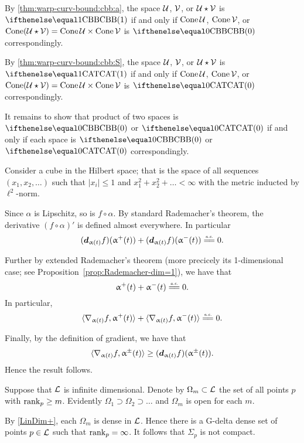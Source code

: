 By \ref{thm:warp-curv-bound:cbb:a}, the space $\mathcal{U}$, $\mathcal{V}$, or $\mathcal{U}\star\mathcal{V}$ is $\Alex1$ if and only if $\mathop{\rm Cone}\nolimits\mathcal{U}$, $\mathop{\rm Cone}\nolimits\mathcal{V}$, or $\Cone(\spc{U}\star\spc{V})=\Cone\spc{U}\times\Cone\spc{V}$ is $\Alex0$ correspondingly.

By \ref{thm:warp-curv-bound:cbb:S}, the space $\mathcal{U}$, $\mathcal{V}$, or $\mathcal{U}\star\mathcal{V}$ is $\CAT1$ if and only if $\mathop{\rm Cone}\nolimits\mathcal{U}$, $\mathop{\rm Cone}\nolimits\mathcal{V}$, or $\Cone(\spc{U}\star\spc{V})=\Cone\spc{U}\times\Cone\spc{V}$ is $\CAT0$ correspondingly.

It remains to show that product of two spaces is $\Alex0$ or $\CAT0$ if and only if each space is $\Alex0$ or $\CAT0$ correspondingly.

Consider a cube in the Hilbert space;
that is the space of all sequences $(x_1,x_2,\dots)$ such that $|x_i|\le 1$ and $x_1^2+x_2^2+\dots<\infty$ with the metric inducted by $\ell^2$-norm.




Since $\alpha$ is Lipschitz, so is $f\circ\alpha$.
By standard Rademacher's theorem, the derivative $(f\circ\alpha)'$ is defined almost everywhere.
In particular 
\[(\dd_{\alpha(t)}f)(\alpha^+(t))+(\dd_{\alpha(t)}f)(\alpha^-(t))\ae0.\]

Further by extended Rademacher's theorem (more precicely its 1-dimensional case; see Proposition~\ref{prop:Rademacher-dim=1}),
we have that
\[\alpha^+(t)+\alpha^-(t)\ae0.\]
In particular,
\[\<\nabla_{\alpha(t)}f,\alpha^+(t)\>+\<\nabla_{\alpha(t)}f,\alpha^-(t)\>
\ae0.\]

Finally, by the definition of gradient, we have that 
\[\<\nabla_{\alpha(t)}f,\alpha^\pm(t)\>\ge (\dd_{\alpha(t)}f)(\alpha^\pm(t)).\]
Hence the result follows.


Suppose that $\mathcal{L}$ is infinite dimensional.
Denote by $\Omega_m\subset \spc{L}$ the set of all points $p$ with $\rank_p\ge m$.
Evidently $\Omega_1\supset \Omega_2\supset\dots$ and $\Omega_m$ is open for each $m$.

By \ref{LinDim+}, each $\Omega_m$ is dense in $\mathcal{L}$.
Hence there is a G-delta dense set of points $p\in\spc{L}$ such that $\mathop{\rm rank}\nolimits_p=\infty$.
It follows that $\Sigma_p$ is not compact.

